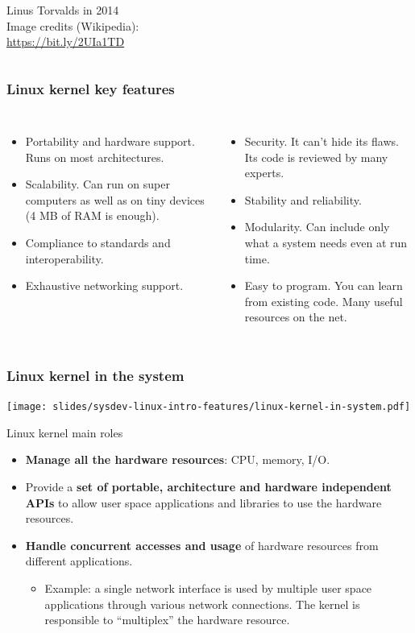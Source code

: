 \begin{frame}
\begin{columns}
      \scriptsize
      Linus Torvalds in 2014\\
      \tiny
      Image credits (Wikipedia):\\
      \url{https://bit.ly/2UIa1TD}
    \end{columns}
\end{frame}

\begin{frame}
  \frametitle{Linux kernel key features}
  \begin{columns}
    \begin{itemize}
    \item Portability and hardware support. Runs on most
      architectures.
    \item Scalability. Can run on super computers as well as on tiny
      devices (4 MB of RAM is enough).
    \item Compliance to standards and interoperability.
    \item Exhaustive networking support.
    \end{itemize}
    \begin{itemize}
    \item Security. It can't hide its flaws. Its code is reviewed by
      many experts.
    \item Stability and reliability.
    \item Modularity. Can include only what a system needs even at run
      time.
    \item Easy to program. You can learn from existing code. Many
      useful resources on the net.
    \end{itemize}
  \end{columns}
\end{frame}

\begin{frame}
  \frametitle{Linux kernel in the system}
  \begin{center}
    \texttt{[image: slides/sysdev-linux-intro-features/linux-kernel-in-system.pdf]}
  \end{center}
\end{frame}

\begin{frame}{Linux kernel main roles}
  \begin{itemize}
  \item {\bf Manage all the hardware resources}: CPU, memory, I/O.
  \item Provide a {\bf set of portable, architecture and hardware
      independent APIs} to allow user space applications and libraries
    to use the hardware resources.
  \item {\bf Handle concurrent accesses and usage} of hardware
    resources from different applications.
    \begin{itemize}
    \item Example: a single network interface is used by multiple
      user space applications through various network connections. The
      kernel is responsible to ``multiplex'' the hardware resource.
    \end{itemize}
  \end{itemize}
\end{frame}

